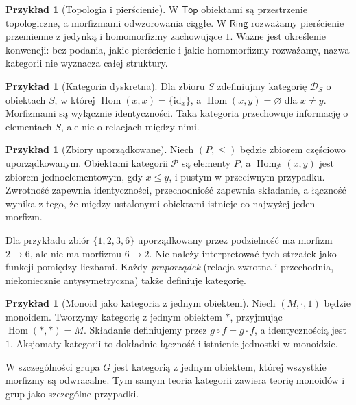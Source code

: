 \documentclass[11pt,a4paper]{article}
\numberwithin{equation}{section}
\theoremstyle{plain}
\theoremstyle{definition}
\newtheorem{przyklad}[twierdzenie]{Przykład}
\theoremstyle{remark}
\newcommand{\cat}[1]{\mathsf{#1}}
\newcommand{\Ring}{\cat{Ring}}
\newcommand{\Top}{\cat{Top}}
\newcommand{\id}{\mathrm{id}}
\newcommand{\Hom}{\operatorname{Hom}}
\begin{document}
\begin{przyklad}[Topologia i pierścienie]
W $\Top$ obiektami są przestrzenie topologiczne, a morfizmami odwzorowania ciągłe. W $\Ring$ rozważamy pierścienie przemienne z jedynką i homomorfizmy zachowujące $1$. Ważne jest określenie konwencji: bez podania, jakie pierścienie i jakie homomorfizmy rozważamy, nazwa kategorii nie wyznacza całej struktury.
\end{przyklad}

\begin{przyklad}[Kategoria dyskretna]
Dla zbioru $S$ zdefiniujmy kategorię $\mathcal D_S$ o obiektach $S$, w której $\Hom(x,x)=\{\id_x\}$, a $\Hom(x,y)=\varnothing$ dla $x\neq y$. Morfizmami są wyłącznie identyczności. Taka kategoria przechowuje informację o elementach $S$, ale nie o relacjach między nimi.
\end{przyklad}

\begin{przyklad}[Zbiory uporządkowane]\label{przyklad:poset}
Niech $(P,\leq)$ będzie zbiorem częściowo uporządkowanym. Obiektami kategorii $\mathcal P$ są elementy $P$, a $\Hom_{\mathcal P}(x,y)$ jest zbiorem jednoelementowym, gdy $x\leq y$, i pustym w przeciwnym przypadku. Zwrotność zapewnia identyczności, przechodniość zapewnia składanie, a łączność wynika z tego, że między ustalonymi obiektami istnieje co najwyżej jeden morfizm.

Dla przykładu zbiór $\{1,2,3,6\}$ uporządkowany przez podzielność ma morfizm $2\to 6$, ale nie ma morfizmu $6\to 2$. Nie należy interpretować tych strzałek jako funkcji pomiędzy liczbami. Każdy \emph{praporządek} (relacja zwrotna i przechodnia, niekoniecznie antysymetryczna) także definiuje kategorię.
\end{przyklad}

\begin{przyklad}[Monoid jako kategoria z jednym obiektem]\label{przyklad:monoid-kat}
Niech $(M,\cdot,1)$ będzie monoidem. Tworzymy kategorię z jednym obiektem $*$, przyjmując $\Hom(*,*)=M$. Składanie definiujemy przez $g\circ f=g\cdot f$, a identycznością jest $1$. Aksjomaty kategorii to dokładnie łączność i istnienie jednostki w monoidzie.

W szczególności grupa $G$ jest kategorią z jednym obiektem, której wszystkie morfizmy są odwracalne. Tym samym teoria kategorii zawiera teorię monoidów i grup jako szczególne przypadki.
\end{przyklad}
\end{document}
